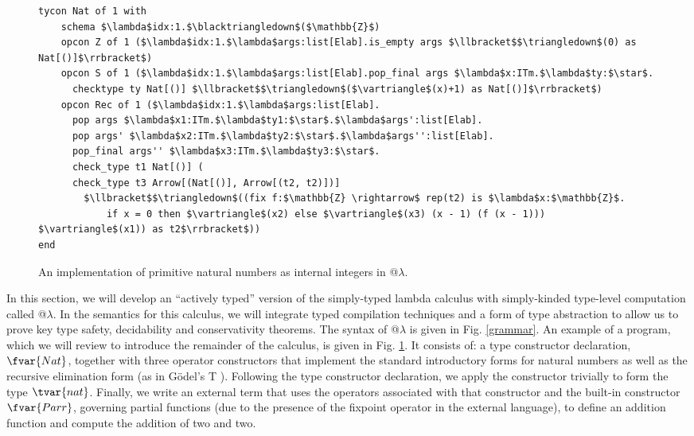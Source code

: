 \begin{figure}[t]
\begin{lstlisting}
tycon Nat of 1 with  
    schema $\lambda$idx:1.$\blacktriangledown$($\mathbb{Z}$) 
    opcon Z of 1 ($\lambda$idx:1.$\lambda$args:list[Elab].is_empty args $\llbracket$$\triangledown$(0) as Nat[()]$\rrbracket$)
    opcon S of 1 ($\lambda$idx:1.$\lambda$args:list[Elab].pop_final args $\lambda$x:ITm.$\lambda$ty:$\star$. 
      checktype ty Nat[()] $\llbracket$$\triangledown$($\vartriangle$(x)+1) as Nat[()]$\rrbracket$)
    opcon Rec of 1 ($\lambda$idx:1.$\lambda$args:list[Elab].
      pop args $\lambda$x1:ITm.$\lambda$ty1:$\star$.$\lambda$args':list[Elab].
      pop args' $\lambda$x2:ITm.$\lambda$ty2:$\star$.$\lambda$args'':list[Elab].
      pop_final args'' $\lambda$x3:ITm.$\lambda$ty3:$\star$.
      check_type t1 Nat[()] (
      check_type t3 Arrow[(Nat[()], Arrow[(t2, t2)])] 
      	$\llbracket$$\triangledown$((fix f:$\mathbb{Z} \rightarrow$ rep(t2) is $\lambda$x:$\mathbb{Z}$.
	        if x = 0 then $\vartriangle$(x2) else $\vartriangle$(x3) (x - 1) (f (x - 1))) $\vartriangle$(x1)) as t2$\rrbracket$))
end
\end{lstlisting}
\caption{An implementation of primitive natural numbers as internal integers in @$\lambda$.}
\label{nat-atlam}
\end{figure}
In this section, we will develop an ``actively typed'' version of the simply-typed lambda calculus with simply-kinded type-level computation called @$\lambda$. In the semantics for this calculus, we will integrate typed compilation techniques and a form of type abstraction to allow us to prove key type safety, decidability and conservativity theorems. The syntax of @$\lambda$ is given in Fig. \ref{grammar}. An example of a program, which we will review to introduce the remainder of the calculus, is given in Fig. \ref{nat-atlam}. It consists of:
a type constructor declaration, $\fvar{Nat}$, together with three operator constructors that implement the standard introductory forms for natural numbers as well as the recursive elimination form (as in G\"odel's T \cite{pfpl}). Following the type constructor declaration, we apply the constructor trivially to form the type $\tvar{nat}$. Finally, we write an external term that uses the operators associated with that constructor and the built-in constructor $\fvar{Parr}$, governing partial functions (due to the presence of the fixpoint operator in the external language), to define an addition function and compute the addition of two and two. 

